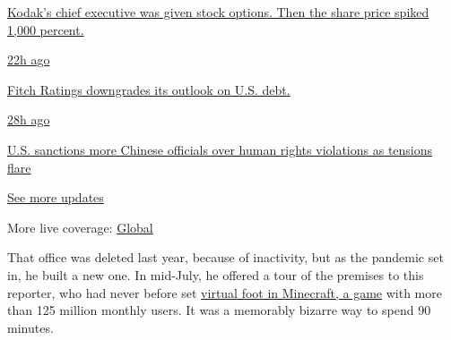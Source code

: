 \href{https://www.nytimes3xbfgragh.onion/live/2020/07/31/business/stock-market-today-coronavirus?action=click\&pgtype=Article\&state=default\&region=MAIN_CONTENT_1\&context=storylines_live_updates\#kodaks-chief-executive-was-given-stock-options-then-the-share-price-spiked-1000-percent}{Kodak's
chief executive was given stock options. Then the share price spiked
1,000 percent.}

\href{https://www.nytimes3xbfgragh.onion/live/2020/07/31/business/stock-market-today-coronavirus?action=click\&pgtype=Article\&state=default\&region=MAIN_CONTENT_1\&context=storylines_live_updates\#fitch-ratings-downgrades-its-outlook-on-us-debt}{22h
ago}

\href{https://www.nytimes3xbfgragh.onion/live/2020/07/31/business/stock-market-today-coronavirus?action=click\&pgtype=Article\&state=default\&region=MAIN_CONTENT_1\&context=storylines_live_updates\#fitch-ratings-downgrades-its-outlook-on-us-debt}{Fitch
Ratings downgrades its outlook on U.S. debt.}

\href{https://www.nytimes3xbfgragh.onion/live/2020/07/31/business/stock-market-today-coronavirus?action=click\&pgtype=Article\&state=default\&region=MAIN_CONTENT_1\&context=storylines_live_updates\#us-sanctions-more-chinese-officials-over-human-rights-violations-as-tensions-flare}{28h
ago}

\href{https://www.nytimes3xbfgragh.onion/live/2020/07/31/business/stock-market-today-coronavirus?action=click\&pgtype=Article\&state=default\&region=MAIN_CONTENT_1\&context=storylines_live_updates\#us-sanctions-more-chinese-officials-over-human-rights-violations-as-tensions-flare}{U.S.
sanctions more Chinese officials over human rights violations as
tensions flare}

\href{https://www.nytimes3xbfgragh.onion/live/2020/07/31/business/stock-market-today-coronavirus?action=click\&pgtype=Article\&state=default\&region=MAIN_CONTENT_1\&context=storylines_live_updates}{See
more updates}

More live coverage:
\href{https://www.nytimes3xbfgragh.onion/2020/08/01/world/coronavirus-covid-19.html?action=click\&pgtype=Article\&state=default\&region=MAIN_CONTENT_1\&context=storylines_live_updates}{Global}

That office was deleted last year, because of inactivity, but as the
pandemic set in, he built a new one. In mid-July, he offered a tour of
the premises to this reporter, who had never before set
\href{https://www.nytimes3xbfgragh.onion/2016/04/17/magazine/the-minecraft-generation.html}{virtual
foot in Minecraft, a game} with more than 125 million monthly users. It
was a memorably bizarre way to spend 90 minutes.

